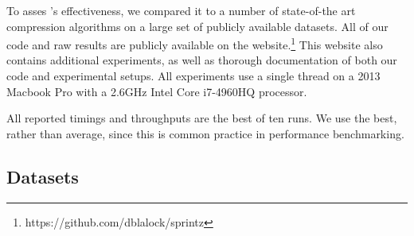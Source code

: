

To asses \mine's effectiveness, we compared it to a number of state-of-the art compression algorithms on a large set of publicly available datasets. All of our code and raw results are publicly available on the \minesp website.\footnote{https://github.com/dblalock/sprintz} This website also contains additional experiments, as well as thorough documentation of both our code and experimental setups. All experiments use a single thread on a 2013 Macbook Pro with a 2.6GHz Intel Core i7-4960HQ processor.

All reported timings and throughputs are the best of ten runs. We use the best, rather than average, since this is common practice in performance benchmarking.

\subsection{Datasets}

